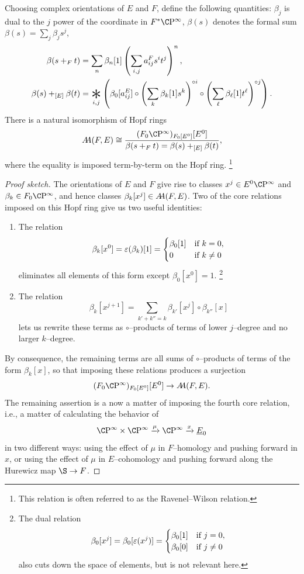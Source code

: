 \begin{lemma}\label{UnstableRWRelation}
Choosing complex orientations of \(E\) and \(F\), define the following quantities: \(\beta_j\) is dual to the \(j\){\th} power of the coordinate in \(F^* \CP^\infty\), \(\beta(s)\) denotes the formal sum \(\beta(s) = \sum_j \beta_j s^j\),
\begin{align*}
\beta(s +_F t) & = \sum_n \beta_n[1] \left(\sum_{i, j} a_{ij}^F s^i t^j \right)^n, \\
\beta(s) +_{[E]} \beta(t) & = \bigast_{i, j} \left(\beta_0[a_{ij}^E] \circ \left( \sum_k \beta_k[1] s^k \right)^{\circ i} \circ \left( \sum_\ell \beta_\ell[1] t^\ell \right)^{\circ j} \right).
\end{align*}
There is a natural isomorphism of Hopf rings \[\AA(F, E) \cong \frac{(F_0 \CP^\infty)_{F_0[E^0]}[E^0]}{\beta(s +_F t) = \beta(s) +_{[E]} \beta(t)},\] where the equality is imposed term-by-term on the Hopf ring.%
\footnote{%
This relation is often referred to as the Ravenel--Wilson relation.
}
\end{lemma}
\begin{proof}[Proof sketch]
The orientations of \(E\) and \(F\) give rise to classes \(x^j \in E^0 \CP^\infty\) and \(\beta_k \in F_0 \CP^\infty\), and hence classes \(\beta_k[x^j] \in \AA(F, E)\).
Two of the core relations imposed on this Hopf ring give us two useful identities:
\begin{enumerate}
    \item The relation \[\beta_k[x^0] = \eps(\beta_k)[1] = \begin{cases} \beta_0[1] & \text{if \(k = 0\)}, \\ 0 & \text{if \(k \ne 0\)}\end{cases}\] eliminates all elements of this form except \(\beta_0[x^0] = 1\).%
\footnote{%
          The dual relation \[\beta_0[x^j] = \beta_0[\eps(x^j)] = \begin{cases} \beta_0[1] & \text{if \(j = 0\)}, \\ \beta_0[0] & \text{if \(j \ne 0\)}\end{cases}\] also cuts down the space of elements, but is not relevant here.
}
    \item The relation \[\beta_k[x^{j+1}] = \sum_{k' + k'' = k} \beta_{k'}[x^j] \circ \beta_{k''}[x]\] lets us rewrite these terms as \(\circ\)--products of terms of lower \(j\)--degree and no larger \(k\)--degree.
\end{enumerate}
By consequence, the remaining terms are all sums of \(\circ\)--products of terms of the form \(\beta_k[x]\), so that imposing these relations produces a surjection \[(F_0 \CP^\infty)_{F_0[E^0]}[E^0] \to \AA(F, E).\]
The remaining assertion is a now a matter of imposing the fourth core relation, i.e., a matter of calculating the behavior of \[\CP^\infty \times \CP^\infty \xrightarrow{\mu} \CP^\infty \xrightarrow{x} \OS{E}{0}\] in two different ways: using the effect of \(\mu\) in \(F\)--homology and pushing forward in \(x\), or using the effect of \(\mu\) in \(E\)--cohomology and pushing forward along the Hurewicz map \(\S \to F\).
\end{proof}
